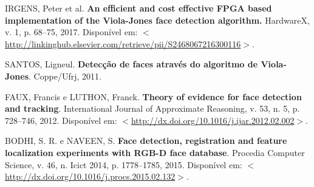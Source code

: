 \documentclass[12pt,a4paper]{article}
\begin{document}
\noindent IRGENS, Peter et al. \textbf{An efficient and cost effective FPGA based implementation of the Viola-Jones face detection algorithm.} HardwareX, v. 1, p. 68–75, 2017. Disponível em: $<$\url{http://linkinghub.elsevier.com/retrieve/pii/S2468067216300116}$>$.\\\vspace{0.2cm}

\noindent SANTOS, Ligneul. \textbf{Detecção de faces através do algoritmo de Viola-Jones}. Coppe/Ufrj, 2011.\\\vspace{0.2cm}

\noindent FAUX, Francis e LUTHON, Franck. \textbf{Theory of evidence for face detection and tracking}. International Journal of Approximate Reasoning, v. 53, n. 5, p. 728–746, 2012. Disponível em: $<$\url{http://dx.doi.org/10.1016/j.ijar.2012.02.002}$>$.\\\vspace{0.2cm}

\noindent BODHI, S. R. e NAVEEN, S. \textbf{Face detection, registration and feature localization experiments with RGB-D face database}. Procedia Computer Science, v. 46, n. Icict 2014, p. 1778–1785, 2015. Disponível em: $<$\url{http://dx.doi.org/10.1016/j.procs.2015.02.132}$>$.
\end{document}

